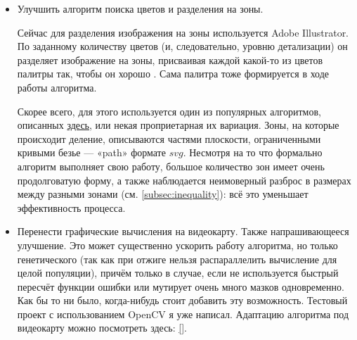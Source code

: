 \documentclass[11pt]{article}
\begin{document}
\begin{itemize}
        \item Улучшить алгоритм поиска цветов и разделения на зоны.

                Сейчас для разделения изображения на зоны используется Adobe Illustrator.
                По заданному количеству цветов (и, следовательно, уровню детализации) он разделяет изображение на зоны,
                присваивая каждой какой-то из цветов палитры так, чтобы он хорошо .
                Сама палитра тоже формируется в ходе работы алгоритма.

                Скорее всего, для этого используется один из популярных алгоритмов, описанных \href{https://en.wikipedia.org/wiki/Color_quantization}{здесь}, или некая проприетарная их вариация.
                Зоны, на которые происходит деление, описываются частями плоскости, ограниченными кривыми безье — «path»  формате $svg$.
                Несмотря на то что формально алгоритм выполняет свою работу, большое количество зон имеет очень продолговатую форму,
                а также наблюдается неимоверный разброс в размерах между разными зонами (см. \ref{subsec:inequality}):
                всё это уменьшает эффективность процесса.


        \item Перенести графические вычисления на видеокарту.
                Также напрашивающееся улучшение.
                Это может существенно ускорить работу алгоритма, но только генетического (так как при отжиге нельзя распараллелить вычисление для целой популяции),
                причём только в случае, если не используется быстрый пересчёт функции ошибки или мутирует очень много мазков одновременно.
                Как бы то ни было, когда-нибудь стоит добавить эту возможность.
                Тестовый проект с использованием OpenCV я уже написал.
                Адаптацию алгоритма под видеокарту можно посмотреть здесь: \ref{}.



    \end{itemize}
\end{document}
